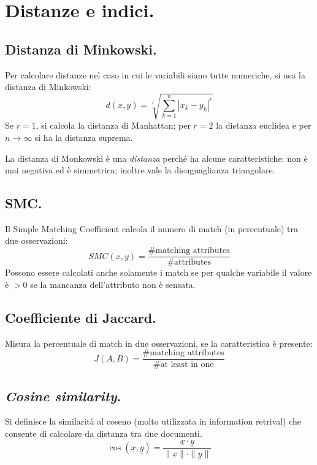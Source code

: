 \documentclass[11pt, a4page, twocolumn]{article}
\begin{document}
\section{Distanze e indici.}
\subsection{Distanza di Minkowski.}
Per calcolare distanze nel caso in cui le variabili siano tutte numeriche, si usa la distanza di Minkowski:
\begin{equation*}
d(x, y) = \sqrt[r]{\sum^{n}_{k=1}{|x_k - y_k|^r}}
\end{equation*}
Se $r = 1$, si calcola la distanza di Manhattan; per $r = 2$ la distanza euclidea e per $n \to \infty$ si ha la distanza suprema.

La distanza di Monkowski è una \textit{distanza} perché ha alcune caratteristiche: non è mai negativa ed è simmetrica; inoltre vale la disuguaglianza triangolare.

\subsection{SMC.}
Il Simple Matching Coefficient calcola il numero di match (in percentuale) tra due osservazioni:
\begin{equation*}
SMC(x, y) = \frac{\text{\# matching attributes}}{\text{\# attributes}}
\end{equation*}
Possono essere calcolati anche solamente i match se per qualche variabile il valore è $> 0$ se la mancanza dell'attributo non è sensata.

\subsection{Coefficiente di Jaccard.}
Misura la percentuale di match in due osservazioni, se la caratteristica è presente:
\begin{equation*}
J(A, B) = \frac{\text{\# matching attributes}}{\text{\# at least in one}}
\end{equation*}

\subsection{\textit{Cosine similarity}.}
Si definisce la similarità al coseno (molto utilizzata in information retrival) che consente di calcolare da distanza tra due documenti.
\begin{equation*}
  \cos(\underline{x}, \underline{y}) = \frac{\underline{x} \cdot \underline{y}}{\|\underline{x}\| \cdot \|\underline{y}\|}
\end{equation*}
\end{document}
